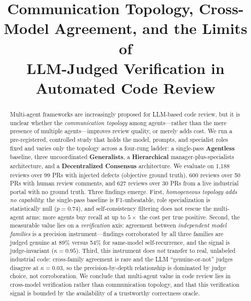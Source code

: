 \documentclass[conference]{IEEEtran}
\begin{document}
\title{Communication Topology, Cross-Model Agreement, and the Limits of\\
LLM-Judged Verification in Automated Code Review}

\author{
}

\maketitle

\begin{abstract}
Multi-agent frameworks are increasingly proposed for LLM-based code review, but
it is unclear whether the \emph{communication topology} among agents---rather
than the mere presence of multiple agents---improves review quality, or merely
adds cost. We run a pre-registered, controlled study that holds the model,
prompts, and specialist roles fixed and varies only the topology across a
four-rung ladder: a single-pass \textbf{Agentless} baseline, three uncoordinated
\textbf{Generalists}, a \textbf{Hierarchical} manager-plus-specialists
architecture, and a \textbf{Decentralized Consensus} architecture. We evaluate on
1{,}188 reviews over 99 PRs with injected defects (objective ground truth), 600
reviews over 50 PRs with human review comments, and 627 reviews over 30 PRs from
a live industrial portal with no ground truth. Three findings emerge. First,
\emph{homogeneous topology adds no capability}: the single-pass baseline is
F1-unbeatable, role specialization is statistically null ($p{=}0.74$), and
self-consistency filtering does not rescue the multi-agent arms; more agents buy
recall at up to $5\times$ the cost per true positive. Second, the measurable
value lies on a \emph{verification} axis: agreement between \emph{independent
model families} is a precision instrument---findings corroborated by all three
families are judged genuine at 89\% versus 54\% for same-model self-recurrence,
and the signal is judge-invariant ($\kappa{=}0.95$). Third, this instrument does
\emph{not} transfer to real, unlabeled industrial code: cross-family agreement is
rare and the LLM ``genuine-or-not'' judges disagree at $\kappa{=}0.03$, so the
precision-by-depth relationship is dominated by judge choice, not corroboration.
We conclude that multi-agent value in code review lies in cross-model
verification rather than communication topology, and that this verification
signal is bounded by the availability of a trustworthy correctness oracle.
\end{abstract}
\end{document}
